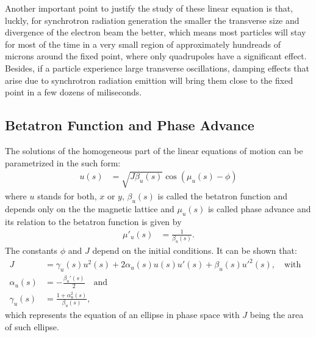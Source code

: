 \documentclass[
	12pt,				%
	openright,			%
	oneside,			%
	a4paper,		%
	chapter=TITLE,		%
	section=TITLE,		%
    brazil,				%
	english,			%
	sumario=tradicional,
	]{abntex2}
\begin{document}
	Another important point to justify the study of these linear equation is that, luckly, for synchrotron radiation generation the smaller the transverse size and divergence of the electron beam the better, which means most particles will stay for most of the time in a very small region of approximately hundreads of microns around the fixed point, where only quadrupoles have a significant effect. Besides, if a particle experience large transverse oscillations, damping effects that arise due to synchrotron radiation emittion will bring them close to the fixed point in a few dozens of miliseconds.


    \subsection{Betatron Function and Phase Advance} \label{ssub:betatron_function}

	The solutions of the homogeneous part of the linear equations of motion can be parametrized in the such form:
	\begin{align} \label{eq:betatron_motion}
		u(s) &= \sqrt{J\beta_u(s)} \cos(\mu_u(s) - \phi)
	\end{align}
	where $u$ stands for both, $x$ or $y$, $\beta_u(s)$ is called the betatron function and depends only on the the magnetic lattice and $\mu_u(s)$ is called phase advance and its relation to the betatron function is given by
	\begin{align}
		\mu'_u(s) &= \frac{1}{\beta_u(s)}.
	\end{align}
	The constants $\phi$ and $J$ depend on the initial conditions. It can be shown that:
	\begin{align} \label{eq:linear_invariant}
		J &= \gamma_u(s)u^2(s) + 2\alpha_u(s)u(s)u'(s) + \beta_u(s)u'^2(s),
												\quad \text{with}& \\
        \alpha_u(s) &= -\frac{\beta_u'(s)}{2} \quad \text{and}& \nonumber \\ \nonumber
		\gamma_u(s) &= \frac{1+\alpha_u^2(s)}{\beta_u(s)},&
	\end{align}
	which represents the equation of an ellipse in phase space with $J$ being the area of such ellipse.
\end{document}
